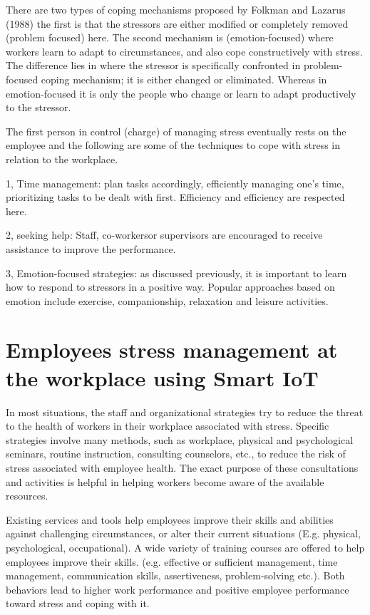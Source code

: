 There are two types of coping mechanisms proposed by Folkman and Lazarus (1988) the first is that the stressors are either modified or completely removed (problem focused) here. The second mechanism is (emotion-focused) where workers learn to adapt to circumstances, and also cope constructively with stress.  The difference lies in where the stressor is specifically confronted in problem-focused coping mechanism; it is either changed or eliminated. Whereas in emotion-focused it is only the people who change or learn to adapt productively to the stressor. \citep[p.326]{Bloisi2007ManagementBehaviour}

The first person in control (charge) of managing stress eventually rests on the employee and the following are some of the techniques to cope with stress in relation to the workplace.

1, Time management: plan tasks accordingly, efficiently managing one's time, prioritizing tasks to be dealt with first. Efficiency and efficiency are respected here.

2, seeking help: Staff, co-workersor supervisors are encouraged to receive assistance to improve the performance.

3, Emotion-focused strategies: as discussed previously, it is important to learn how to respond to stressors in a positive way. Popular approaches based on emotion include exercise, companionship, relaxation and leisure activities. \citep[p.328-333]{Bloisi2007ManagementBehaviour}

\section{Employees stress management at the workplace using Smart \acs{IoT}}
In most situations, the staff and organizational strategies try to reduce the threat to the health of workers in their workplace associated with stress.  Specific strategies involve many methods, such as workplace, physical and psychological seminars, routine instruction, consulting counselors, etc., to reduce the risk of stress associated with employee health. The exact purpose of these consultations and activities is helpful in helping workers become aware of the available resources.

Existing services and tools help employees improve their skills and abilities against challenging circumstances, or alter their current situations (E.g. physical, psychological, occupational). A wide variety of training courses are offered to help employees improve their skills.  (e.g. effective or sufficient management, time management, communication skills, assertiveness, problem-solving etc.)\citep{Michie2002CausesWork.}. Both behaviors lead to higher work performance and positive employee performance toward stress and coping with it. 

